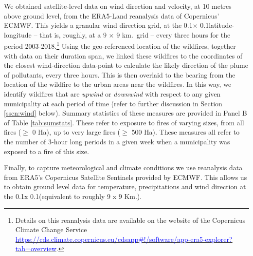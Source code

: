 \documentclass[11pt]{article}
\begin{document}
\begin{spacing}{1.3}
We obtained satellite-level data on wind direction and velocity, at 10 metres above ground level, from the ERA5-Land reanalysis data of Copernicus' ECMWF. This yields a granular wind direction grid, at the 0.1\textdegree $\times$ 0.1\textdegree latitude-longitude -- that is, roughly, at a 9 $\times$ 9 km.\ grid -- every three hours for the period 2003-2018.\footnote{Details on this reanalysis data are available on the website of the Copernicus Climate Change Service \hyperlink{https://cds.climate.copernicus.eu/cdsapp\#!/software/app-era5-explorer?tab=overview}{\textcolor{blue}{https://cds.climate.copernicus.eu/cdsapp\#!/software/app-era5-explorer?tab=overview}}.} Using the geo-referenced location of the wildfires, together with data on their duration span, we linked these wildfires to the coordinates of the closest wind-direction data-point to calculate the likely direction of the plume of pollutants, every three hours. This is then overlaid to the bearing from the location of the wildfire to the urban areas near the wildfires. In this way, we identify wildfires that are \textit{upwind} or \textit{downwind} with respect to any given municipality at each period of time (refer to further discussion in Section \ref{sscn:wind} below). Summary statistics of these measures are provided in Panel B of Table \ref{tab:sumstats}.  These refer to exposure to fires of varying sizes, from all fires ($\geq$ 0 Ha), up to very large fires ($\geq$ 500 Ha).  These measures all refer to the number of 3-hour long periods in a given week when a municipality was exposed to a fire of this size.  

Finally, to capture meteorological and climate conditions we use reanalysis data from ERA5's Copernicus Satellite Sentinels provided by ECMWF. This allows us to obtain ground level data for temperature, precipitations and wind direction at the 0.1\textdegree x 0.1\textdegree (equivalent to roughly 9 x 9 Km.). %





\end{spacing}
\end{document}
